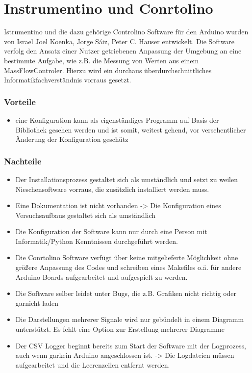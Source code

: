 \section{Instrumentino und Conrtolino}
Istrumentino und die dazu gehörige Controlino Software für den Arduino wurden 
von Israel Joel Koenka, Jorge Sáiz, Peter C. Hauser entwickelt. Die Software 
verfolg den Ansatz einer Nutzer getriebenen Anpassung der Umgebung an eine 
bestimmte Aufgabe, wie z.B. die Messung von Werten aus einem MassFlowControler.
Hierzu wird ein durchaus überdurchschnittliches Informatikfachverständnis 
vorraus gesetzt.

\subsubsection{Vorteile}
\begin{itemize}
 \item eine Konfiguration kann als eigenständiges Programm auf Basis der 
Bibliothek gesehen werden und ist somit, weitest gehend, vor versehentlicher 
Änderung der Konfiguration geschütz
\end{itemize}

\subsubsection{Nachteile}
\begin{itemize}
 \item Der Installationsprozess gestaltet sich als umständlich und setzt zu 
weilen Nieschensoftware vorraus, die zusätzlich installiert werden muss.
 \item Eine Dokumentation ist nicht vorhanden -> Die Konfiguration eines 
Versuchsaufbaus gestaltet sich als umständlich
 \item Die Konfiguration der Software kann nur durch eine Person mit 
Informatik/Python Kenntnissen durchgeführt werden.
 \item Die Conrtolino Software verfügt über keine mitgelieferte Möglichkeit 
ohne größere Anpassung des Codes und schreiben eines Makefiles o.ä. für andere 
Arduino Boards aufgearbeitet und aufgespielt zu werden.
 \item Die Software selber leidet unter Bugs, die z.B. Grafiken nicht richtig 
oder garnicht laden
 \item Die Darstellungen mehrerer Signale wird nur gebündelt in einem Diagramm 
unterstützt. Es fehlt eine Option zur Erstellung mehrerer Diagramme
 \item Der CSV Logger beginnt bereits zum Start der Software mit der 
Logprozess, auch wenn garkein Arduino angeschlossen ist. -> Die Logdateien 
müssen aufgearbeitet und die Leerenzeilen entfernt werden.
\end{itemize}
